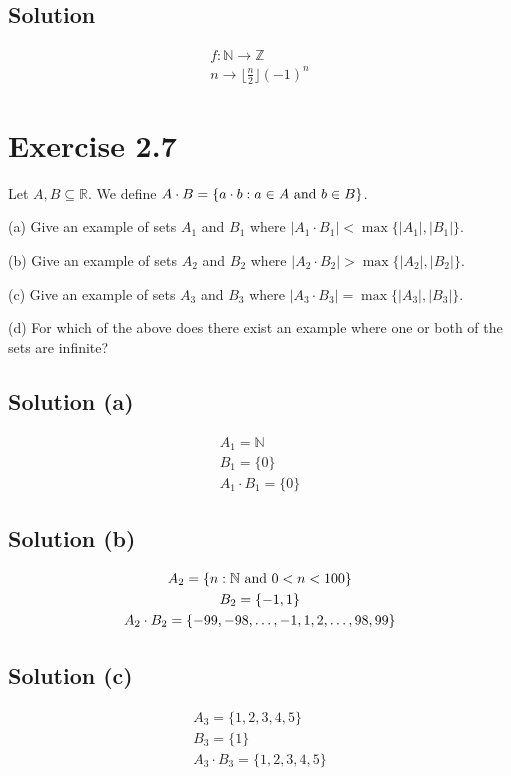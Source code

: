 \documentclass[12pt]{report}
\begin{document}
\subsection*{Solution}
\begin{gather}
    f: \mathbb{N \to Z}\\
    n \to \lfloor\frac{n}{2}\rfloor (-1)^n
\end{gather}

\pagebreak
\section{Exercise 2.7}
Let $A, B \subseteq \mathbb{R}$. We define  $A \cdot B = \{a \cdot b: a \in A \text{ and } b \in B\}$.  

(a) Give an example of sets $A_1$ and $B_1$ where $\left|A_1 \cdot B_1\right| < \max\{|A_1|, |B_1|\}$.  

(b) Give an example of sets $A_2$ and $B_2$ where $\left|A_2 \cdot B_2\right| > \max\{|A_2|, |B_2|\}$.

(c) Give an example of sets $A_3$ and $B_3$ where $\left|A_3 \cdot B_3\right| = \max\{|A_3|, |B_3|\}$.

(d) For which of the above does there exist an example where one or both of the sets are infinite? 

\subsection{Solution (a)}
\begin{gather}
    A_1 = \mathbb{N}\\
    B_1 = \{0\}\\
    A_1 \cdot B_1 = \{0\}
\end{gather}

\subsection{Solution (b)}
\begin{gather}
    A_2 = \{n : \mathbb{N} \text{ and } 0 < n < 100\}\\
    B_2 = \{-1, 1\}\\
    A_2 \cdot B_2 = \{-99, -98, \dots , -1, 1, 2, \dots , 98, 99\}
\end{gather}

\subsection{Solution (c)}
\begin{gather}
    A_3 = \{1, 2, 3, 4, 5\}\\
    B_3 = \{1\}\\
    A_3 \cdot B_3 = \{1,2,3,4,5\}
\end{gather}
\end{document}
